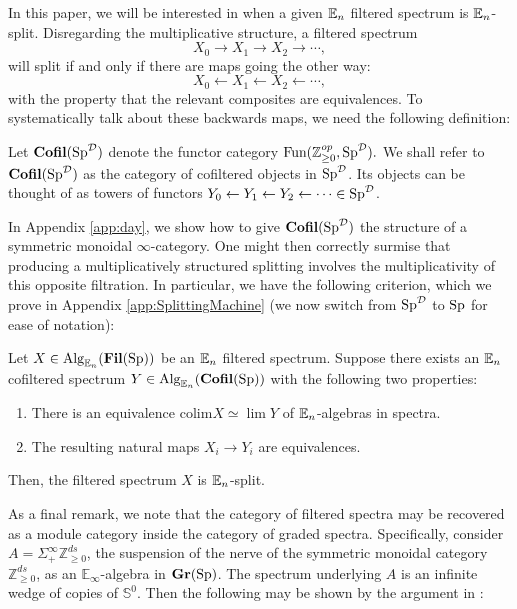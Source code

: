 In this paper, we will be interested in when a given $\operatorname{\mathbb{E}}_n$ filtered spectrum is $\operatorname{\mathbb{E}}_n$-split.  Disregarding the multiplicative structure, a filtered spectrum $$X_0\longrightarrow X_1 \longrightarrow X_2 \longrightarrow \cdots ,$$ will split if and only if there are maps going the other way: $$X_0 \longleftarrow X_1 \longleftarrow X_2 \longleftarrow \cdots,$$ with the property that the relevant composites are equivalences.   To systematically talk about these backwards maps, we need the following definition:

\begin{dfn} Let $\operatorname{\mathbf{Cofil}}(\operatorname{\mathrm{Sp}}^{\operatorname{\mathcal{D}}})$ denote the functor category $\operatorname{\text{Fun}}(\operatorname{\mathbb{Z}}_{\geq 0}^{op}, \operatorname{\mathrm{Sp}}^{\operatorname{\mathcal{D}}}).$  We shall refer to $\operatorname{\mathbf{Cofil}}(\operatorname{\mathrm{Sp}}^{\operatorname{\mathcal{D}}})$ as the category of cofiltered objects in $\operatorname{\mathrm{Sp}}^{\operatorname{\mathcal{D}}}$.  Its objects can be thought of as towers of functors $Y_0\leftarrow Y_1\leftarrow Y_2 \leftarrow \cdots \in \operatorname{\mathrm{Sp}}^{\operatorname{\mathcal{D}}}$.
\end{dfn}

In Appendix \ref{app:day}, we show how to give $\operatorname{\mathbf{Cofil}}(\operatorname{\mathrm{Sp}}^{\operatorname{\mathcal{D}}})$ the structure of a symmetric monoidal $\infty$-category.  One might then correctly surmise that producing a multiplicatively structured splitting involves the multiplicativity of this opposite filtration.  In particular, we have the following criterion, which we prove in Appendix \ref{app:SplittingMachine} (we now switch from $\operatorname{\mathrm{Sp}}^{\operatorname{\mathcal{D}}}$ to $\operatorname{\mathrm{Sp}}$ for ease of notation):

\begin{thm}\label{thm:SplitMachine}%
Let $X\in \operatorname{\mathrm{Alg}}_{\operatorname{\mathbb{E}}_n}(\operatorname{\mathbf{Fil}}(\operatorname{\mathrm{Sp}}))$ be an $\operatorname{\mathbb{E}}_n$ filtered spectrum.  Suppose there exists an $\operatorname{\mathbb{E}}_n$ cofiltered spectrum $Y\in \operatorname{\mathrm{Alg}}_{\operatorname{\mathbb{E}}_n}(\operatorname{\mathbf{Cofil}}(\operatorname{\mathrm{Sp}}))$ with the following two properties:
\begin{enumerate}
\item There is an equivalence $\mathrm{colim } X \simeq \lim Y$ of $\operatorname{\mathbb{E}}_n$-algebras in spectra.
\item The resulting natural maps $X_i \to Y_i$ are equivalences.  
\end{enumerate}
Then, the filtered spectrum $X$ is $\operatorname{\mathbb{E}}_n$-split.
\end{thm}




As a final remark, we note that the category of filtered spectra may be recovered as a module category inside the category of graded spectra.  Specifically, consider $A=\Sigma^{\infty}_+ \mathbb{Z}^{ds}_{\ge 0}$, the suspension of the nerve of the symmetric monoidal category $\mathbb{Z}^{ds}_{\ge 0}$, as an $\mathbb{E}_\infty$-algebra in $\operatorname{\mathbf{Gr}}(\operatorname{\mathrm{Sp}})$.  The spectrum underlying $A$ is an infinite wedge of copies of $\mathbb{S}^0$.  Then the following may be shown by the argument in \cite[Proposition 3.1.6]{LurieRot}:

